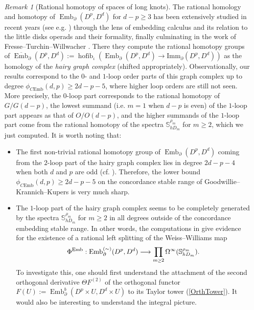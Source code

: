 \documentclass[a4paper, oneside]{amsart}
\newcommand{\emb}{\operatorname{Emb}}
\newcommand{\hofib}{\operatorname{hofib}}
\newcommand{\cemb}{C\mathrm{Emb}}
\newcommand{\1}{\mathds{1}}
\theoremstyle{remark}
\newtheorem{rem}[thm]{Remark}%
\theoremstyle{definition}
\newcommand{\geqs}{\scaleobj{0.85}{\geq}}
\newcommand{\s}{\mathbb{S}}
\numberwithin{equation}{section}
\begin{document}
\begin{rem}[Rational homotopy of spaces of long knots]\label{rationallongknotsrem} The rational homology and homotopy of $\emb_\partial(D^p, D^d)$ for $d-p\geq 3$ has been extensively studied in recent years (see e.g. \cite{TurchinLongKnots1, AroneTurchinHomologyLK, AroneTurchinHomotopyLK}) through the lens of embedding calculus and its relation to the little disks operads and their formality, finally culminating in the work of Fresse--Turchin--Willwacher \cite{FresseTurchinWillwacher}. There they compute the rational homotopy groups of $\overline{\emb}_\partial(D^p,D^d):=\hofib_\iota(\emb_\partial(D^p,D^d)\to \mathrm{Imm}_\partial(D^p,D^d))$ as the homology of the \textit{hairy graph complex} (shifted appropriately). Observationally, our results correspond to the $0$- and $1$-loop order parts of this graph complex up to degree $\phi_{\cemb}(d,p)\geq 2d-p-5$, where higher loop orders are still not seen. More precisely, the $0$-loop part corresponds to the rational homotopy of $G/G(d-p)$, the lowest summand (i.e. $m=1$ when $d-p$ is even) of the $1$-loop part appears as that of $O/O(d-p)$, and the higher summands of the $1$-loop part come from the rational homotopy of the spectra $\s^{\rho_m}_{hD_m}$ for $m\geq 2$, which we just computed. It is worth noting that:
\begin{itemize}
    \item The first non-trivial rational homotopy group of $\emb_\partial(D^p,D^d)$ coming from the $2$-loop part of the hairy graph complex lies in degree $2d-p-4$ when both $d$ and $p$ are odd (cf. \cite[Eq. 3]{FresseTurchinWillwacher}). Therefore, the lower bound $\phi_{\cemb}(d,p)\geq 2d-p-5$ on the concordance stable range of Goodwillie--Krannich--Kupers is very much sharp.
\vspace{2pt}
    \item The $1$-loop part of the hairy graph complex seems to be completely generated by the spectra $\s^{\rho_m}_{hD_m}$ for $m\geq 2$ in all degrees outside of the concordance embedding stable range. In other words, the computations in \cite{FresseTurchinWillwacher} give evidence for the existence of a rational left splitting of the Weiss--Williams map
    $$
\Phi^{\emb}:\emb^{(\sim)}_\partial(D^p,D^d)\longrightarrow \prod_{m\geqs 2} \Omega^{\infty}(\s^{\rho_m}_{hD_m}).
    $$
    To investigate this, one should first understand the attachment of the second orthogonal derivative $\Theta F^{(2)}$ of the orthogonal functor $F(U):=\emb^b_\partial(D^p\times U, D^d\times U)$ to its Taylor tower (\ref{OrthTower}). It would also be interesting to understand the integral picture. 
\end{itemize}
    
\end{rem}
\end{document}

